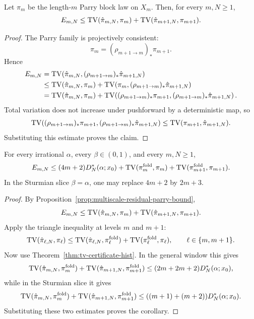 \begin{proposition}\label{prop:multiscale-residual-parry-bound}
Let \(\pi_m\) be the length-\(m\) Parry block law on \(X_m\). Then, for every
\(m,N\ge1\),
\[
E_{m,N}
\le
\operatorname{TV}(\hat\pi_{m,N},\pi_m)+\operatorname{TV}(\hat\pi_{m+1,N},\pi_{m+1}).
\]
\end{proposition}

\begin{proof}
The Parry family is projectively consistent:
\[
\pi_m=(\rho_{m+1\to m})_*\pi_{m+1}.
\]
Hence
\[
\begin{aligned}
E_{m,N}
&=
\operatorname{TV}\!\left(\hat\pi_{m,N},(\rho_{m+1\to m})_*\hat\pi_{m+1,N}\right)\\
&\le
\operatorname{TV}(\hat\pi_{m,N},\pi_m)
+
\operatorname{TV}\!\left(\pi_m,(\rho_{m+1\to m})_*\hat\pi_{m+1,N}\right)\\
&=
\operatorname{TV}(\hat\pi_{m,N},\pi_m)
+
\operatorname{TV}\!\left((\rho_{m+1\to m})_*\pi_{m+1},
(\rho_{m+1\to m})_*\hat\pi_{m+1,N}\right).
\end{aligned}
\]
Total variation does not increase under pushforward by a deterministic map, so
\[
\operatorname{TV}\!\left((\rho_{m+1\to m})_*\pi_{m+1},
(\rho_{m+1\to m})_*\hat\pi_{m+1,N}\right)
\le
\operatorname{TV}(\pi_{m+1},\hat\pi_{m+1,N}).
\]
Substituting this estimate proves the claim.
\end{proof}

\begin{corollary}
\label{cor:multiscale-residual-comparison-bound}
For every irrational \(\alpha\), every \(\beta\in(0,1)\), and every
\(m,N\ge1\),
\[
E_{m,N}
\le
(4m+2)D_N^*(\alpha;x_0)
+
\operatorname{TV}(\pi_m^{\mathrm{fold}},\pi_m)
+
\operatorname{TV}(\pi_{m+1}^{\mathrm{fold}},\pi_{m+1}).
\]
In the Sturmian slice \(\beta=\alpha\), one may replace \(4m+2\) by
\(2m+3\).
\end{corollary}

\begin{proof}
By Proposition~\ref{prop:multiscale-residual-parry-bound},
\[
E_{m,N}
\le
\operatorname{TV}(\hat\pi_{m,N},\pi_m)+\operatorname{TV}(\hat\pi_{m+1,N},\pi_{m+1}).
\]
Apply the triangle inequality at levels \(m\) and \(m+1\):
\[
\operatorname{TV}(\hat\pi_{\ell,N},\pi_\ell)
\le
\operatorname{TV}(\hat\pi_{\ell,N},\pi_\ell^{\mathrm{fold}})
+
\operatorname{TV}(\pi_\ell^{\mathrm{fold}},\pi_\ell),
\qquad \ell\in\{m,m+1\}.
\]
Now use Theorem~\ref{thm:tv-certificate-hist}. In the general window this gives
\[
\operatorname{TV}(\hat\pi_{m,N},\pi_m^{\mathrm{fold}})
+
\operatorname{TV}(\hat\pi_{m+1,N},\pi_{m+1}^{\mathrm{fold}})
\le
(2m+2m+2)D_N^*(\alpha;x_0),
\]
while in the Sturmian slice it gives
\[
\operatorname{TV}(\hat\pi_{m,N},\pi_m^{\mathrm{fold}})
+
\operatorname{TV}(\hat\pi_{m+1,N},\pi_{m+1}^{\mathrm{fold}})
\le
((m+1)+(m+2))D_N^*(\alpha;x_0).
\]
Substituting these two estimates proves the corollary.
\end{proof}
